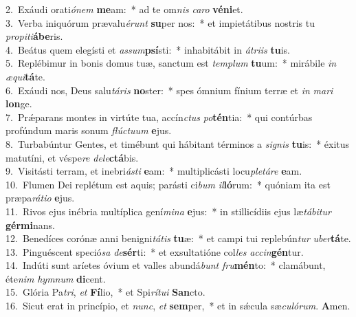 {2.~}Exáudi orati\textit{ó}\textit{nem} \textbf{me}am:~* ad te om\textit{nis} \textit{ca}\textit{ro} \textbf{vé}\textbf{ni}et.\\
{3.~}Verba iniquórum prævalu\textit{é}\textit{runt} \textbf{su}per nos:~* et impietátibus nostris tu \textit{pro}\textit{pi}\textit{ti}\textbf{á}\textbf{be}ris.\\
{4.~}Beátus quem elegísti et \textit{as}\textit{sum}\textbf{psí}sti:~* inhabitábit in \textit{á}\textit{tri}\textit{is} \textbf{tu}is.\\
{5.~}Replébimur in bonis domus tuæ, sanctum est \textit{tem}\textit{plum} \textbf{tu}um:~* mirábile \textit{in} \textit{æ}\textit{qui}\textbf{tá}te.\\
{6.~}Exáudi nos, Deus salu\textit{tá}\textit{ris} \textbf{no}ster:~* spes ómnium fínium terræ et \textit{in} \textit{ma}\textit{ri} \textbf{lon}ge.\\
{7.~}Prǽparans montes in virtúte tua, accín\textit{ctus} \textit{po}\textbf{tén}tia:~* qui contúrbas profúndum maris sonum \textit{flú}\textit{ctu}\textit{um} \textbf{e}jus.\\
{8.~}Turbabúntur Gentes, et timébunt qui hábitant términos a \textit{si}\textit{gnis} \textbf{tu}is:~* éxitus matutíni, et véspe\textit{re} \textit{de}\textit{le}\textbf{ctá}bis.\\
{9.~}Visitásti terram, et inebri\textit{á}\textit{sti} \textbf{e}am:~* multiplicásti locu\textit{ple}\textit{tá}\textit{re} \textbf{e}am.\\
{10.~}Flumen Dei replétum est aquis; parásti ci\textit{bum} \textit{il}\textbf{ló}rum:~* quóniam ita est præpa\textit{rá}\textit{ti}\textit{o} \textbf{e}jus.\\
{11.~}Rivos ejus inébria multíplica gení\textit{mi}\textit{na} \textbf{e}jus:~* in stillicídiis ejus læ\textit{tá}\textit{bi}\textit{tur} \textbf{gér}\textbf{mi}nans.\\
{12.~}Benedíces corónæ anni benigni\textit{tá}\textit{tis} \textbf{tu}æ:~* et campi tui replebún\textit{tur} \textit{u}\textit{ber}\textbf{tá}te.\\
{13.~}Pinguéscent speció\textit{sa} \textit{de}\textbf{sér}ti:~* et exsultatióne col\textit{les} \textit{ac}\textit{cin}\textbf{gén}tur.\\
{14.~}Indúti sunt aríetes óvium et valles abundá\textit{bunt} \textit{fru}\textbf{mén}to:~* clamábunt, éte\textit{nim} \textit{hym}\textit{num} \textbf{di}cent.\\
{15.~}Glória Pa\textit{tri}, \textit{et} \textbf{Fí}lio,~* et Spi\textit{rí}\textit{tu}\textit{i} \textbf{San}cto.\\
{16.~}Sicut erat in princípio, et \textit{nunc}, \textit{et} \textbf{sem}per,~* et in sǽcula sæ\textit{cu}\textit{ló}\textit{rum}. \textbf{A}men.\\
